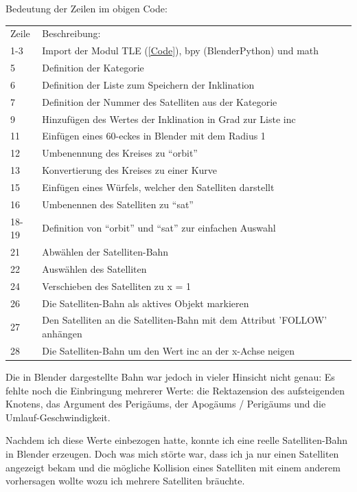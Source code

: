 Bedeutung der Zeilen im obigen Code:
\\\bigskip

\begin{tabular}{l l}
 Zeile & Beschreibung: \\
 1-3 & Import der Modul TLE (\ref{Code}), bpy (BlenderPython) und math \\
 5 & Definition der Kategorie \\
 6 & Definition der Liste zum Speichern der Inklination \\
 7 & Definition der Nummer des Satelliten aus der Kategorie \\
 9 & Hinzufügen des Wertes der Inklination in Grad zur Liste inc \\
 11 & Einfügen eines 60-eckes in Blender mit dem Radius 1 \\
 12 & Umbenennung des Kreises zu ``orbit'' \\
 13 & Konvertierung des Kreises zu einer Kurve \\
 15 & Einfügen eines Würfels, welcher den Satelliten darstellt \\
 16 & Umbenennen des Satelliten zu ``sat'' \\
 18-19 & Definition von ``orbit'' und ``sat'' zur einfachen Auswahl \\
 21 & Abwählen der Satelliten-Bahn \\
 22 & Auswählen des Satelliten \\
 24 & Verschieben des Satelliten zu x = 1 \\
 26 & Die Satelliten-Bahn als aktives Objekt markieren \\ 
 27 & Den Satelliten an die Satelliten-Bahn mit dem Attribut 'FOLLOW' anhängen \\
 28 & Die Satelliten-Bahn um den Wert inc an der x-Achse neigen \\
 
 
\end{tabular}
\bigskip

Die in Blender dargestellte Bahn war jedoch in vieler Hinsicht nicht genau: Es fehlte noch die
Einbringung mehrerer Werte: die Rektazension des aufsteigenden Knotens, das Argument des
Perigäums, der Apogäums / Perigäums und die Umlauf-Geschwindigkeit.
\par
Nachdem ich diese Werte einbezogen hatte, konnte ich eine reelle Satelliten-Bahn in Blender erzeugen.
Doch was mich störte war, dass ich ja nur einen Satelliten angezeigt bekam und die mögliche
Kollision eines Satelliten mit einem anderem vorhersagen wollte wozu ich mehrere Satelliten
bräuchte. 

